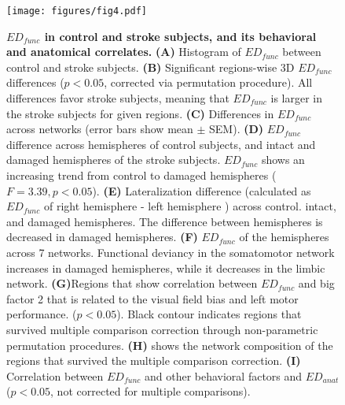 \documentclass[fleqn,10pt]{wlscirep}
\begin{document}
\begin{figure}[]
\centering
\texttt{[image: figures/fig4.pdf]}
\caption{\label{fig:fig4} \textbf{$\textit{ED}_{{func}}$ in control and stroke subjects, and its behavioral and anatomical correlates. }  \textbf{(A)} Histogram of $\textit{ED}_{{func}}$ between control and stroke subjects. \textbf{(B)} Significant regions-wise 3D $\textit{ED}_{{func}}$ differences ($p < 0.05$, corrected via permutation procedure). All differences favor stroke subjects, meaning that $\textit{ED}_{{func}}$ is larger in the stroke subjects for given regions. \textbf{(C) }Differences in $\textit{ED}_{{func}}$ across networks (error bars show mean $\pm$ SEM). \textbf{(D)} $\textit{ED}_{{func}}$ difference across hemispheres of control subjects, and intact and damaged hemispheres of the stroke subjects. $\textit{ED}_{{func}}$ shows an increasing trend from control to damaged hemispheres ($ F = 3.39, p < 0.05 $). \textbf{(E)} Lateralization difference (calculated as $\textit{ED}_{{func}}$ of right hemisphere - left hemisphere ) across control. intact, and damaged hemispheres. The difference between hemispheres is decreased in damaged hemispheres. \textbf{(F)} $\textit{ED}_{{func}}$ of the hemispheres across 7 networks. Functional deviancy in the somatomotor network increases in damaged hemispheres, while it decreases in the limbic network. \textbf{(G)}Regions that show correlation between $\textit{ED}_{{func}}$ and big factor 2 that is related to the visual field bias and left motor performance. ($p < 0.05$). Black contour indicates regions that survived multiple comparison correction  through non-parametric permutation procedures. \textbf{(H)} shows the network composition of the regions that survived the multiple comparison correction. \textbf{(I)} Correlation between $\textit{ED}_{{func}}$ and other behavioral factors and $\textit{ED}_{{anat}}$ ($p < 0.05$, not corrected for multiple comparisons). }
\end{figure}
\end{document}
